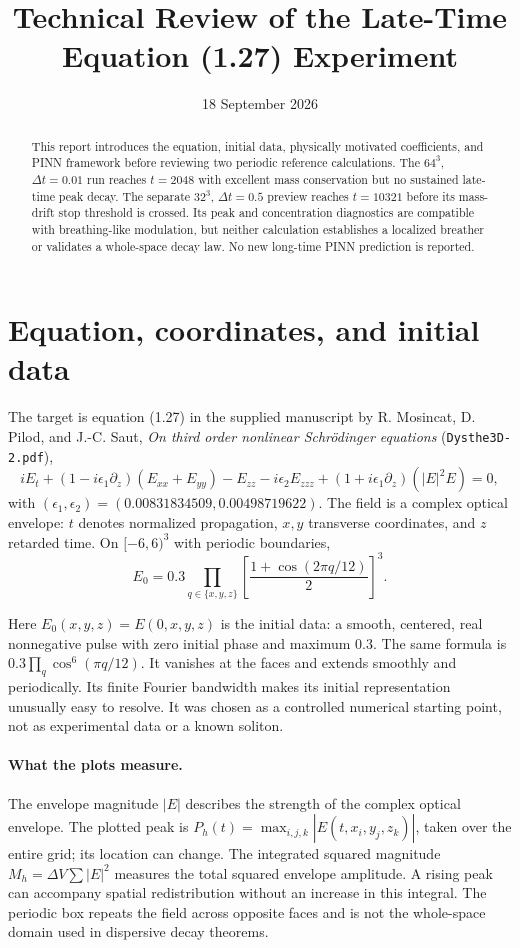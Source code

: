 \documentclass[10pt]{article}
\title{Technical Review of the Late-Time Equation (1.27) Experiment}
\author{}\date{18 September 2026}
\begin{document}
\maketitle
\begin{abstract}
This report introduces the equation, initial data, physically motivated coefficients, and PINN framework before reviewing two periodic reference calculations. The $64^3$, $\Delta t=0.01$ run reaches $t=2048$ with excellent mass conservation but no sustained late-time peak decay. The separate $32^3$, $\Delta t=0.5$ preview reaches $t=10321$ before its mass-drift stop threshold is crossed. Its peak and concentration diagnostics are compatible with breathing-like modulation, but neither calculation establishes a localized breather or validates a whole-space decay law. No new long-time PINN prediction is reported.
\end{abstract}

\section{Equation, coordinates, and initial data}
The target is equation (1.27) in the supplied manuscript by R. Mosincat, D. Pilod, and J.-C. Saut, \textit{On third order nonlinear Schr\"odinger equations} (\texttt{Dysthe3D-2.pdf}),
\[
iE_t+(1-i\epsilon_1\partial_z)(E_{xx}+E_{yy})-E_{zz}
-i\epsilon_2E_{zzz}+(1+i\epsilon_1\partial_z)(|E|^2E)=0,
\]
with $(\epsilon_1,\epsilon_2)=(0.00831834509,0.00498719622)$. The field is a complex optical envelope: $t$ denotes normalized propagation, $x,y$ transverse coordinates, and $z$ retarded time. On $[-6,6)^3$ with periodic boundaries,
\[
E_0=0.3\prod_{q\in\{x,y,z\}}\left[\frac{1+\cos(2\pi q/12)}{2}\right]^3.
\]

Here $E_0(x,y,z)=E(0,x,y,z)$ is the initial data: a smooth, centered, real nonnegative pulse with zero initial phase and maximum $0.3$. The same formula is $0.3\prod_q\cos^6(\pi q/12)$. It vanishes at the faces and extends smoothly and periodically. Its finite Fourier bandwidth makes its initial representation unusually easy to resolve. It was chosen as a controlled numerical starting point, not as experimental data or a known soliton.

\paragraph{What the plots measure.}
The envelope magnitude $|E|$ describes the strength of the complex optical envelope. The plotted peak is $P_h(t)=\max_{i,j,k}|E(t,x_i,y_j,z_k)|$, taken over the entire grid; its location can change. The integrated squared magnitude $M_h=\Delta V\sum|E|^2$ measures the total squared envelope amplitude. A rising peak can accompany spatial redistribution without an increase in this integral. The periodic box repeats the field across opposite faces and is not the whole-space domain used in dispersive decay theorems.
\end{document}
